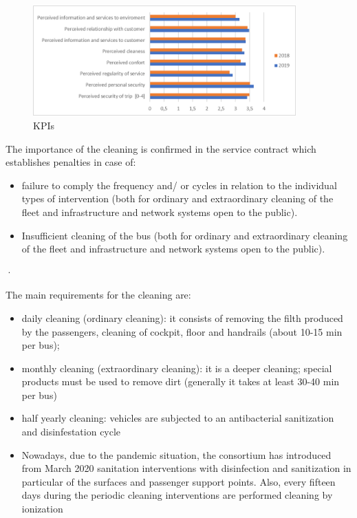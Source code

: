 \begin{figure}[h]
    \centering
    \includegraphics[width=0.9\textwidth]{Images/Social_sustainability/graph.png}
    \caption{KPIs}
    \label{fig:kpis}
\end{figure}
The importance of the cleaning is confirmed in the service contract which establishes penalties in case of:
\begin{itemize}
    \item failure to comply the frequency and/ or cycles in relation to the individual types of intervention (both for ordinary and extraordinary cleaning of the fleet and infrastructure and network systems open to the public).
    \item Insufficient cleaning of the bus (both for ordinary and extraordinary cleaning of the fleet and infrastructure and network systems open to the public).
\end{itemize}
·	


The main requirements for the cleaning are:
\begin{itemize}
    \item	daily cleaning (ordinary cleaning): it consists of removing the filth produced by the passengers, cleaning of cockpit, floor and handrails (about 10-15 min per bus);
    \item monthly cleaning (extraordinary cleaning): it is a deeper cleaning; special products must be used to remove dirt (generally it takes at least 30-40 min per bus)
    \item half yearly cleaning: vehicles are subjected to an antibacterial sanitization and disinfestation cycle 
    \item Nowadays, due to the pandemic situation, the consortium has introduced from March 2020 sanitation interventions with disinfection and sanitization in particular of the surfaces and passenger support points. Also, every fifteen days during the periodic cleaning interventions are performed cleaning by ionization
\end{itemize}


